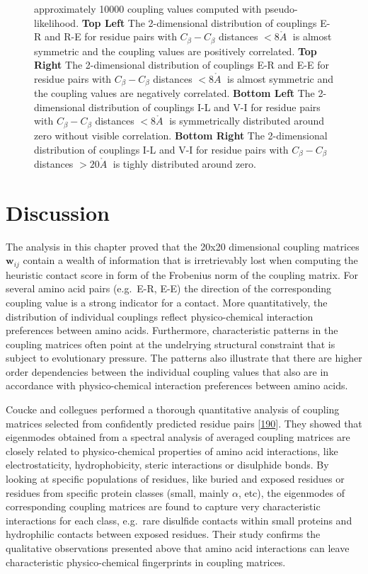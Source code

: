 \documentclass[11pt,a4paper,twoside]{book}
\newcommand{\Cb}{C_\beta}
\newcommand{\wij}{\mathbf{w}_{ij}}
\newcommand{\angstrom}{\mathring{A} \;}
\theoremstyle{definition}
\theoremstyle{definition}
\theoremstyle{remark}
\begin{document}
\begin{figure}
{approximately 10000 coupling values computed with pseudo-likelihood.
\textbf{Top Left} The 2-dimensional distribution of couplings E-R and
R-E for residue pairs with \(\Cb-\Cb\) distances \(< 8 \angstrom\) is
almost symmetric and the coupling values are positively correlated.
\textbf{Top Right} The 2-dimensional distribution of couplings E-R and
E-E for residue pairs with \(\Cb-\Cb\) distances \(< 8 \angstrom\) is
almost symmetric and the coupling values are negatively correlated.
\textbf{Bottom Left} The 2-dimensional distribution of couplings I-L and
V-I for residue pairs with \(\Cb-\Cb\) distances \(< 8 \angstrom\) is
symmetrically distributed around zero without visible correlation.
\textbf{Bottom Right} The 2-dimensional distribution of couplings I-L
and V-I for residue pairs with \(\Cb-\Cb\) distances \(> 20 \angstrom\)
is tighly distributed around zero.}\label{fig:2d-coupling-profiles-0-8}
\end{figure}

\section{Discussion}\label{discussion}

The analysis in this chapter proved that the 20x20 dimensional coupling
matrices \(\wij\) contain a wealth of information that is irretrievably
lost when computing the heuristic contact score in form of the Frobenius
norm of the coupling matrix. For several amino acid pairs (e.g.~E-R,
E-E) the direction of the corresponding coupling value is a strong
indicator for a contact. More quantitatively, the distribution of
individual couplings reflect physico-chemical interaction preferences
between amino acids. Furthermore, characteristic patterns in the
coupling matrices often point at the undelrying structural constraint
that is subject to evolutionary pressure. The patterns also illustrate
that there are higher order dependencies between the individual coupling
values that also are in accordance with physico-chemical interaction
preferences between amino acids.

Coucke and collegues performed a thorough quantitative analysis of
coupling matrices selected from confidently predicted residue pairs
{[}\protect\hyperlink{ref-Coucke2016}{190}{]}. They showed that
eigenmodes obtained from a spectral analysis of averaged coupling
matrices are closely related to physico-chemical properties of amino
acid interactions, like electrostaticity, hydrophobicity, steric
interactions or disulphide bonds. By looking at specific populations of
residues, like buried and exposed residues or residues from specific
protein classes (small, mainly \(\alpha\), etc), the eigenmodes of
corresponding coupling matrices are found to capture very characteristic
interactions for each class, e.g.~rare disulfide contacts within small
proteins and hydrophilic contacts between exposed residues. Their study
confirms the qualitative observations presented above that amino acid
interactions can leave characteristic physico-chemical fingerprints in
coupling matrices.
\end{document}

